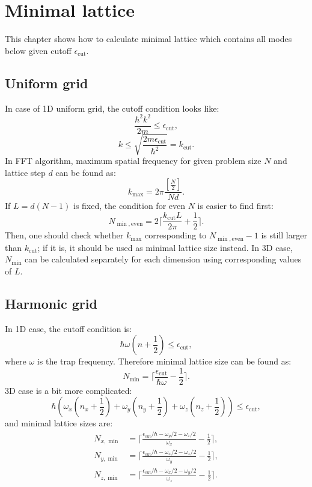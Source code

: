 \chapter{Minimal lattice}
\label{cha:appendix:split-step}

\newcommand{\ecut}{\epsilon_{\mathrm{cut}}}

This chapter shows how to calculate minimal lattice which contains all modes below given cutoff $\ecut$.


\section{Uniform grid}

In case of 1D uniform grid, the cutoff condition looks like:
\[
	\frac{\hbar^2 k^2}{2 m} \le \ecut,
\]
\[
	k \le \sqrt{\frac{2 m \ecut}{\hbar^2}} = k_{\mathrm{cut}}.
\]
In FFT algorithm, maximum spatial frequency for given problem size $N$ and lattice step $d$ can be found as:
\[
	k_{\max} = 2 \pi \frac{ \left[ \frac{N}{2} \right] }{N d}.
\]
If $L = d (N - 1)$ is fixed, the condition for even $N$ is easier to find first:
\[
	N_{\min,\mathrm{even}} = 2 \lceil
		\frac{k_{\mathrm{cut}} L}{2 \pi} + \frac{1}{2}
	\rceil.
\]
Then, one should check whether $k_{\max}$ corresponding to $N_{\min,\mathrm{even}} - 1$ is still larger than $k_{\mathrm{cut}}$; if it is, it should be used as minimal lattice size instead.
In 3D case, $N_{\min}$ can be calculated separately for each dimension using corresponding values of $L$.


\section{Harmonic grid}

In 1D case, the cutoff condition is:
\[
	\hbar \omega ( n + \frac{1}{2} ) \le \ecut,
\]
where $\omega$ is the trap frequency.
Therefore minimal lattice size can be found as:
\[
	N_{\min} = \lceil \frac{\ecut}{\hbar \omega} - \frac{1}{2} \rceil.
\]
3D case is a bit more complicated:
\[
	\hbar \left(
		\omega_x (n_x + \frac{1}{2})
		+ \omega_y (n_y + \frac{1}{2})
		+ \omega_z (n_z + \frac{1}{2})
	\right) \le \ecut,
\]
and minimal lattice sizes are:
\begin{equation*}
\begin{split}
	N_{x,\min} & = \lceil
		\frac{\ecut / \hbar - \omega_y / 2 - \omega_z / 2}{\omega_x} - \frac{1}{2}
	\rceil, \\
	N_{y,\min} & = \lceil
		\frac{\ecut / \hbar - \omega_x / 2 - \omega_z / 2}{\omega_y} - \frac{1}{2}
	\rceil, \\
	N_{z,\min} & = \lceil
		\frac{\ecut / \hbar - \omega_x / 2 - \omega_y / 2}{\omega_z} - \frac{1}{2}
	\rceil.
\end{split}
\end{equation*}
